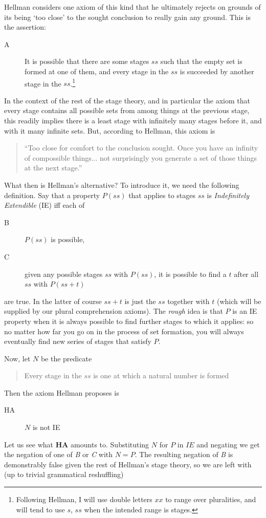 \documentclass{amsart}
\theoremstyle{definition}
\begin{document}
Hellman considers one axiom of this kind 
that he ultimately rejects on grounds of its being `too close' 
to the sought conclusion to really gain any ground. This is the assertion:
\begin{description}
\item[A] It is possible that there are some stages $ss$ 
such that the empty set is formed at one of them, 
and every stage in the $ss$ is succeeded by another stage in the $ss$.\footnote{
    Following Hellman, I will use double letters $xx$ to range over pluralities, 
    and will tend to use $s$, $ss$ when the intended range is stages.
    }
\end{description}
In the context of the rest of the stage theory, 
and in particular the axiom that every stage contains all possible sets 
from among things at the previous stage,
this readily implies there is a least stage with infinitely many stages before it, 
and with it many infinite sets. But, according to Hellman, this axiom is 
\begin{quote} ``Too close for comfort to the conclusion sought. 
    Once you have an infinity of compossible things... 
    not surprisingly you generate a set of those things at the next stage.''\end{quote}
What then is Hellman's alternative? To introduce it, 
we need the following definition. 
Say that a property $P(ss)$ that applies to stages $ss$ is
 \emph{Indefinitely Extendible} (IE) 
iff each of

\begin{description} 
    \item[B]    $P(ss)$ is possible,
    \item[C]    given any possible stages $ss$ with $P(ss)$, 
                it is possible to find a $t$ after all $ss$ with $P(ss + t)$
\end{description}
are true. In the latter of course $ss + t$ is just 
the $ss$ together with $t$ (which will be supplied by 
our plural comprehension axioms). The \emph{rough} idea is that $P$ is 
an IE property when it is always possible to find further 
stages to which it applies: so no matter how far you go on 
in the process of set formation, you will always eventually 
find new series of stages that satisfy $P$.

Now, let $N$ be the predicate
\begin{quote} Every stage in the $ss$ is one at which a natural number is formed
\end{quote} 
Then the axiom Hellman proposes is  
\begin{description}
    \item[HA] $N$ is not IE
\end{description}  
Let us see what {\bf HA} amounts to. Substituting $N$ for $P$ in $IE$ 
and negating we get the negation of one of \emph{B} or \emph{C} with $N = P$. 
The resulting negation of \emph{B} is demonstrably false 
given the rest of Hellman's stage theory, 
so we are left with (up to trivial grammatical reshuffling)
\end{document}
